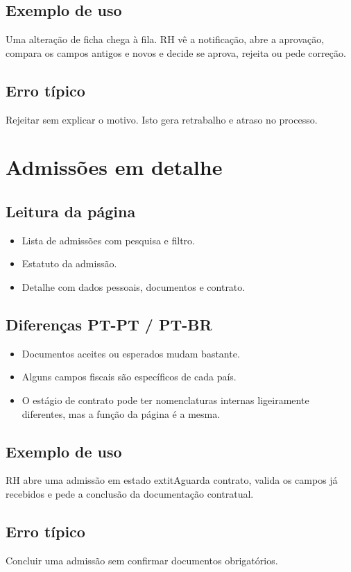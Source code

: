 \subsection{Exemplo de uso}
Uma alteração de ficha chega à fila. RH vê a notificação, abre a aprovação, compara os campos antigos e novos e decide se aprova, rejeita ou pede correção.

\subsection{Erro típico}
Rejeitar sem explicar o motivo. Isto gera retrabalho e atraso no processo.

\section{Admissões em detalhe}
\subsection{Leitura da página}
\begin{itemize}
  \item Lista de admissões com pesquisa e filtro.
  \item Estatuto da admissão.
  \item Detalhe com dados pessoais, documentos e contrato.
\end{itemize}

\subsection{Diferenças PT-PT / PT-BR}
\begin{itemize}
  \item Documentos aceites ou esperados mudam bastante.
  \item Alguns campos fiscais são específicos de cada país.
  \item O estágio de contrato pode ter nomenclaturas internas ligeiramente diferentes, mas a função da página é a mesma.
\end{itemize}

\subsection{Exemplo de uso}
RH abre uma admissão em estado 	extit{Aguarda contrato}, valida os campos já recebidos e pede a conclusão da documentação contratual.

\subsection{Erro típico}
Concluir uma admissão sem confirmar documentos obrigatórios.

